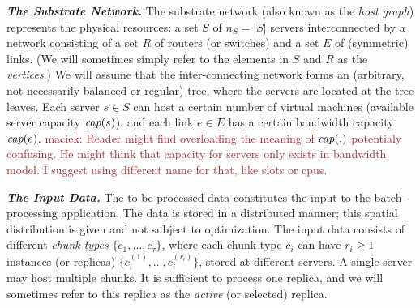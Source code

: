 \documentclass[9pt]{sigcomm-alternate}
\newcommand{\maciek}[1]{\textcolor{brown}{maciek: #1}}
\newcommand{\ChunkType}{\tau}
\newcommand{\achunk}{\ensuremath{c}}
\newcommand{\capacity}{\emph{cap}}
\begin{document}
\textbf{\emph{The Substrate Network.}} The substrate network (also known as the \emph{host graph}) represents the physical resources:
a set $S$ of $n_S=|S|$ servers interconnected by a network consisting of a set $R$ of routers (or switches)
and a set $E$ of (symmetric) links. (We will sometimes simply refer to the elements in $S$ and $R$
as the \emph{vertices}.) We will assume that the inter-connecting network forms an (arbitrary, not necessarily balanced
or regular) tree,
where the servers are located at the tree leaves.
Each server $s\in S$ can host a certain number
of virtual machines (available server capacity $\capacity(s)$), and each link $e\in E$ has a certain bandwidth
capacity $\capacity(e)$. \maciek{Reader might find overloading the meaning of $\capacity(.)$ potentialy confusing. He might think that capacity for servers only exists in bandwidth model. I suggest using different name for that, like slots or cpus.}

\textbf{\emph{The Input Data.}} The to be processed data constitutes the input to the batch-processing application.
The data is stored in a distributed manner; this spatial distribution is given and not subject to optimization.
The input data consists of different \emph{chunk types} $\{\achunk_1, \ldots, \achunk_{\ChunkType}\}$,
where each chunk type $\achunk_i$ can have $r_i\geq 1$ instances (or replicas) $\{\achunk_{i}^{(1)},\ldots, \achunk_{i}^{(r_i)}\}$,
 stored at different servers. A single server may host multiple chunks.
It is sufficient to process one replica, and we will sometimes refer to this
replica as the \emph{active} (or selected) replica.
\end{document}
